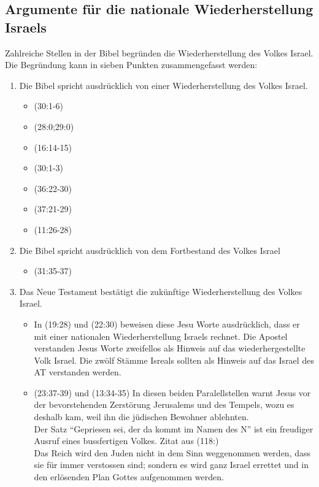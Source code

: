 \documentclass{../../inc/mybib}
\begin{document}
\subsection{Argumente für die nationale Wiederherstellung Israels}
Zahlreiche Stellen in der Bibel begründen die Wiederherstellung des Volkes Israel. Die Begründung kann in sieben Punkten zusammengefasst werden:
\begin{enumerate}
    \item Die Bibel spricht ausdrücklich von einer Wiederherstellung des Volkes Israel.
    \begin{itemize}
        \item {}(30:1-6)
        \item {}(28:0;29:0)
        \item {}(16:14-15)
        \item {}(30:1-3)
        \item {}(36:22-30)
        \item {}(37:21-29)
        \item {}(11:26-28)
    \end{itemize}    
    \item Die Bibel spricht ausdrücklich von dem Fortbestand des Volkes Israel
    \begin{itemize}
        \item {}(31:35-37)
    \end{itemize}
    \item Das Neue Testament bestätigt die zukünftige Wiederherstellung des Volkes Israel.
    \begin{itemize}
        \item In (19:28) und (22:30) beweisen diese Jesu Worte ausdrücklich, dass er mit einer nationalen Wiederherstellung Israels rechnet. Die Apostel verstanden Jesus Worte zweifellos als Hinweis auf das wiederhergestellte Volk Israel. Die zwölf Stämme Isreals sollten als Hinweis auf das Israel des AT verstanden werden.
        \item {}(23:37-39) und (13:34-35) In diesen beiden Paralellstellen warnt Jesus vor der bevorstehenden Zerstörung Jerusalems und des Tempels, wozu es deshalb kam, weil ihn die jüdischen Bewohner ablehnten.\\ Der Satz \enquote{Gepriesen sei, der da kommt im Namen des \herr N} ist ein freudiger Ausruf eines bussfertigen Volkes. Zitat aus (118:) \\ Das Reich wird den Juden nicht in dem Sinn weggenommen werden, dass sie für immer verstossen sind; sondern es wird \flq ganz Israel\frq{} errettet und in den erlösenden Plan Gottes aufgenommen werden.

\end{itemize}
\end{enumerate}
\end{document}
